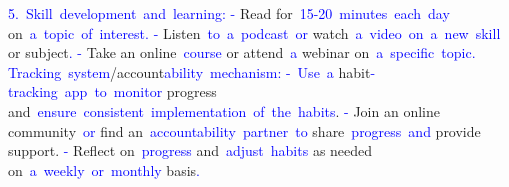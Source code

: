 \documentclass{article}
\begin{document}
\begin{tcolorbox}[colframe=black,colback=white]
{}\textcolor{blue}{5}\textcolor{blue}{.}\textcolor{blue}{~Skill}\textcolor{blue}{~development}\textcolor{blue}{~and}\textcolor{blue}{~learning}\textcolor{blue}{:
}\textcolor{blue}{-} Read for\textcolor{blue}{~}\textcolor{blue}{15}\textcolor{blue}{-}\textcolor{blue}{20}\textcolor{blue}{~minutes}\textcolor{blue}{~each}\textcolor{blue}{~day} on\textcolor{blue}{~a}\textcolor{blue}{~topic}\textcolor{blue}{~of}\textcolor{blue}{~interest}\textcolor{blue}{.
}\textcolor{blue}{-} Listen\textcolor{blue}{~to}\textcolor{blue}{~a}\textcolor{blue}{~podcast}\textcolor{blue}{~or} watch\textcolor{blue}{~a}\textcolor{blue}{~video}\textcolor{blue}{~on}\textcolor{blue}{~a}\textcolor{blue}{~new}\textcolor{blue}{~skill} or subject\textcolor{blue}{.
}\textcolor{blue}{-} Take an online\textcolor{blue}{~course} or attend\textcolor{blue}{~a} webinar on\textcolor{blue}{~a}\textcolor{blue}{~specific}\textcolor{blue}{~topic}\textcolor{blue}{.
}\textcolor{blue}{Tracking}\textcolor{blue}{~system}/account\textcolor{blue}{ability}\textcolor{blue}{~mechanism}\textcolor{blue}{:
}\textcolor{blue}{-}\textcolor{blue}{~Use}\textcolor{blue}{~a} habit\textcolor{blue}{-tracking}\textcolor{blue}{~app}\textcolor{blue}{~to}\textcolor{blue}{~monitor} progress and\textcolor{blue}{~ensure}\textcolor{blue}{~consistent}\textcolor{blue}{~implementation}\textcolor{blue}{~of}\textcolor{blue}{~the}\textcolor{blue}{~habits}.
\textcolor{blue}{-} Join an online community\textcolor{blue}{~or} find an\textcolor{blue}{~accountability}\textcolor{blue}{~partner}\textcolor{blue}{~to} share\textcolor{blue}{~progress}\textcolor{blue}{~and} provide support.
\textcolor{blue}{-} Reflect on\textcolor{blue}{~progress} and\textcolor{blue}{~adjust}\textcolor{blue}{~habits} as needed on\textcolor{blue}{~a}\textcolor{blue}{~weekly}\textcolor{blue}{~or}\textcolor{blue}{~monthly} basis\textcolor{blue}{.}\textcolor{blue}{}
\end{tcolorbox}
\end{document}
